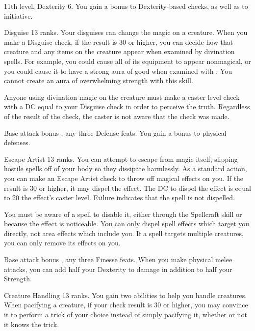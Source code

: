 \featpre 11th level, Dexterity 6.
\featben You gain a  bonus to Dexterity-based checks, as well as to initiative.

\featpre Disguise 13 ranks.
\featben Your disguises can change the magic on a creature. When you make a Disguise check, if the result is 30 or higher, you can decide how that creature and any items on the creature appear when examined by divination spells. For example, you could cause all of its equipment to appear nonmagical, or you could cause it to have a strong aura of good when examined with . You cannot create an aura of overwhelming strength with this skill.

Anyone using divination magic on the creature must make a caster level check with a DC equal to your Disguise check in order to perceive the truth. Regardless of the result of the check, the caster is not aware that the check was made.

\featpre Base attack bonus , any three Defense feats.
\featben You gain a  bonus to physical defenses.

\featpre Escape Artist 13 ranks.
\featben You can attempt to escape from magic itself, slipping hostile spells off of your body so they dissipate harmlessly. As a standard action, you can make an Escape Artist check to throw off magical effects on you. If the result is 30 or higher, it may dispel the effect. The DC to dispel the effect is equal to 20 \add the effect's caster level. Failure indicates that the spell is not dispelled.

You must be aware of a spell to disable it, either through the Spellcraft skill or because the effect is noticeable. You can only dispel spell effects which target you directly, not area effects which include you. If a spell targets multiple creatures, you can only remove its effects on you.

\featpre Base attack bonus , any three Finesse feats.
\featben When you make physical melee attacks, you can add half your Dexterity to damage in addition to half your Strength.

\featpre Creature Handling 13 ranks.
\featben You gain two abilities to help you handle creatures. When pacifying a creature, if your check result is 30 or higher, you may convince it to perform a trick of your choice instead of simply pacifying it, whether or not it knows the trick.

